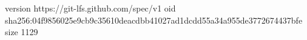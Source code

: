 version https://git-lfs.github.com/spec/v1
oid sha256:04f9856025e9cb9c35610deacdbb41027ad1dcdd55a34a955de3772674437bfe
size 1129
